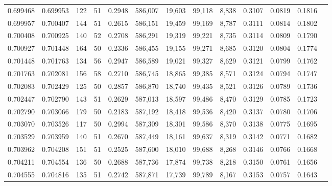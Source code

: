 \begin{tabular}{rrrrrrrrrrrrr}
0.699468 & 0.699953 &   122 &  51 &                                     0.2948 & 586,007 &  19,603 &  99,118 &   8,838 & 0.3107 & 0.0819 & 0.1816 \\
0.699957 & 0.700407 &   144 &  51 &                                     0.2615 & 586,151 &  19,459 &  99,169 &   8,787 & 0.3111 & 0.0814 & 0.1802 \\
0.700408 & 0.700925 &   140 &  52 &                                     0.2708 & 586,291 &  19,319 &  99,221 &   8,735 & 0.3114 & 0.0809 & 0.1790 \\
0.700927 & 0.701448 &   164 &  50 &                                     0.2336 & 586,455 &  19,155 &  99,271 &   8,685 & 0.3120 & 0.0804 & 0.1774 \\
0.701448 & 0.701763 &   134 &  56 &                                     0.2947 & 586,589 &  19,021 &  99,327 &   8,629 & 0.3121 & 0.0799 & 0.1762 \\
0.701763 & 0.702081 &   156 &  58 &                                     0.2710 & 586,745 &  18,865 &  99,385 &   8,571 & 0.3124 & 0.0794 & 0.1747 \\
0.702083 & 0.702429 &   125 &  50 &                                     0.2857 & 586,870 &  18,740 &  99,435 &   8,521 & 0.3126 & 0.0789 & 0.1736 \\
0.702447 & 0.702790 &   143 &  51 &                                     0.2629 & 587,013 &  18,597 &  99,486 &   8,470 & 0.3129 & 0.0785 & 0.1723 \\
0.702790 & 0.703066 &   179 &  50 &                                     0.2183 & 587,192 &  18,418 &  99,536 &   8,420 & 0.3137 & 0.0780 & 0.1706 \\
0.703070 & 0.703526 &   117 &  50 &                                     0.2994 & 587,309 &  18,301 &  99,586 &   8,370 & 0.3138 & 0.0775 & 0.1695 \\
0.703529 & 0.703959 &   140 &  51 &                                     0.2670 & 587,449 &  18,161 &  99,637 &   8,319 & 0.3142 & 0.0771 & 0.1682 \\
0.703962 & 0.704208 &   151 &  51 &                                     0.2525 & 587,600 &  18,010 &  99,688 &   8,268 & 0.3146 & 0.0766 & 0.1668 \\
0.704211 & 0.704554 &   136 &  50 &                                     0.2688 & 587,736 &  17,874 &  99,738 &   8,218 & 0.3150 & 0.0761 & 0.1656 \\
0.704555 & 0.704816 &   135 &  51 &                                     0.2742 & 587,871 &  17,739 &  99,789 &   8,167 & 0.3153 & 0.0757 & 0.1643 \\

\end{tabular}

